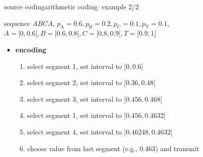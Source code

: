 	\begin{frame}{source coding}{arithmetic coding: example 2/2}
            \vspace{-3mm}
                \begin{footnotesize}
            sequence $ABCA$, $p_\mathrm{A} = 0.6, p_\mathrm{B}= 0.2, p_\mathrm{C}=0.1, p_\mathrm{T}=0.1$, \pause\mbox{\footnotesize $A = [0,0.6[, B= [0.6,0.8[, C=[0.8,0.9[, T=[0.9,1[$}
				\begin{itemize}
					\item \textbf{encoding} 
						\begin{enumerate}
							\item	select segment 1, set interval to $[0,0.6[$
							\pause
							\item	select segment 2, set interval to $[0.36,0.48[$
							\pause
							\item	select segment 3, set interval to $[0.456,0.468[$
							\pause
							\item	select segment 1, set interval to $[0.456, 0.4632[$
							\pause
                            \item   select segment 4, set interval to $[0.46248, 0.4632[$
							\pause
							\item   choose value from last segment (e.g., 0.463) and transmit
						\end{enumerate}
				\end{itemize}
                \end{footnotesize}
	\end{frame}
		
